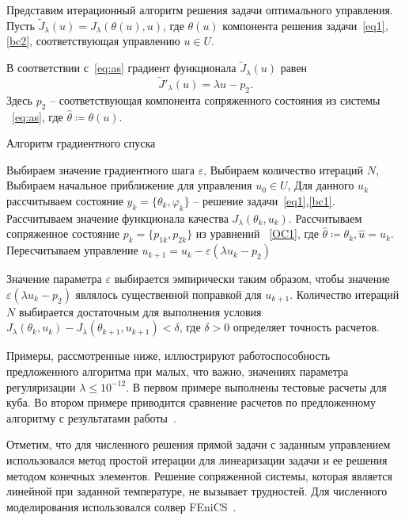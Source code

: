 \documentclass[12pt]{article}
\begin{document}
    Представим итерационный алгоритм решения задачи оптимального управления.
    Пусть $\tilde J_\lambda(u)=J_\lambda(\theta(u), u)$, где $\theta(u)$ компонента решения
    задачи~\eqref{eq1},\eqref{bc2}, соответствующая управлению $u\in U$.

    В соответствии с~\eqref{eq:as} градиент функционала $\tilde J_\lambda(u)$ равен
    \[ \tilde J'_\lambda (u) = \lambda u - p_2. \]
    Здесь $p_2$ -- соответствующая компонента сопряженного состояния из системы ~\eqref{eq:as},
    где $\hat{\theta}\coloneqq\theta(u)$.

    \begin{algorithm}[H]
        \caption{Алгоритм градиентного спуска}
        \label{alg:algorithm}
        \begin{algorithmic}[1]
            \State Выбираем значение градиентного шага $\varepsilon$,
            \State Выбираем количество итераций $N$,
            \State Выбираем начальное приближение для управления $u_0 \in U$,
                \State Для данного $u_k$ рассчитываем состояние $y_k = \{\theta_k, \varphi_k\}$ --
                решение задачи~\eqref{eq1},\eqref{bc1}.
                \State Рассчитываем значение функционала качества $J_\lambda(\theta_k, u_k)$.
                \State Рассчитываем сопряженное состояние $p_k=\{p_{1k},p_{2k}\}$ из уравнений ~\eqref{OC1},
                где $ \hat{\theta} \coloneqq \theta_k, \hat{u}=u_k$.
                \State Пересчитываем управление $u_{k+1} = u_k - \varepsilon (\lambda u_k - p_2)$
            \EndFor
        \end{algorithmic}
    \end{algorithm}
    Значение параметра $\varepsilon$ выбирается эмпирически таким образом, чтобы значение
    $\varepsilon (\lambda u_k - p_2)$ являлось существенной поправкой для $u_{k+1}$.
    Количество итераций $N$ выбирается достаточным для выполнения условия
    $J_\lambda(\theta_k, u_k) - J_\lambda(\theta_{k+1}, u_{k+1}) < \delta$, где $\delta>0$
    определяет точность расчетов.

    Примеры, рассмотренные ниже, иллюстрируют работоспособность предложенного алгоритма при
    малых, что важно, значениях параметра регуляризации $\lambda \leq 10^{-12}$.
    В первом примере выполнены тестовые расчеты для куба.
    Во втором примере приводится сравнение расчетов по
    предложенному алгоритму с результатами работы~\cite{CNSNS19}.

    Отметим, что для численного решения прямой задачи с заданным управлением использовался
    метод простой итерации для линеаризации задачи и ее решения методом конечных элементов.
    Решение сопряженной системы, которая является линейной при заданной температуре, не вызывает трудностей.
    Для численного моделирования использовался солвер FEniCS~\cite{fenics, dolfin}.
\end{document}
